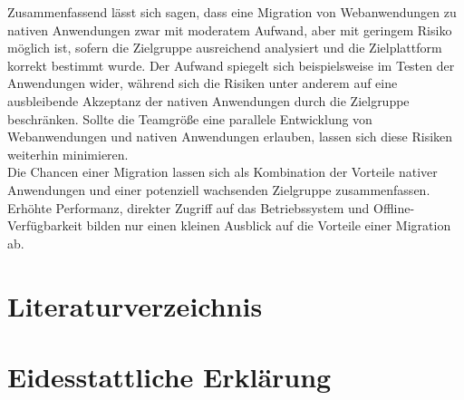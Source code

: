 \documentclass[a4paper]{scrartcl}
\begin{document}
Zusammenfassend lässt sich sagen, dass eine Migration von Webanwendungen zu nativen Anwendungen zwar mit moderatem Aufwand, aber mit geringem Risiko möglich ist, sofern die Zielgruppe ausreichend analysiert und die Zielplattform korrekt bestimmt wurde. Der Aufwand spiegelt sich beispielsweise im Testen der Anwendungen wider, während sich die Risiken unter anderem auf eine ausbleibende Akzeptanz der nativen Anwendungen durch die Zielgruppe beschränken. Sollte die Teamgröße eine parallele Entwicklung von Webanwendungen und nativen Anwendungen erlauben, lassen sich diese Risiken weiterhin minimieren. \\
Die Chancen einer Migration lassen sich als Kombination der Vorteile nativer Anwendungen und einer potenziell wachsenden Zielgruppe zusammenfassen. Erhöhte Performanz, direkter Zugriff auf das Betriebssystem und Offline-Verfügbarkeit bilden nur einen kleinen Ausblick auf die Vorteile einer Migration ab.


\newpage


\setcounter{page}{6}


\section*{Literaturverzeichnis}

\singlespacing


\printbibliography[heading=none]

\newpage


\section*{Eidesstattliche Erklärung}


\onehalfspacing
\end{document}
